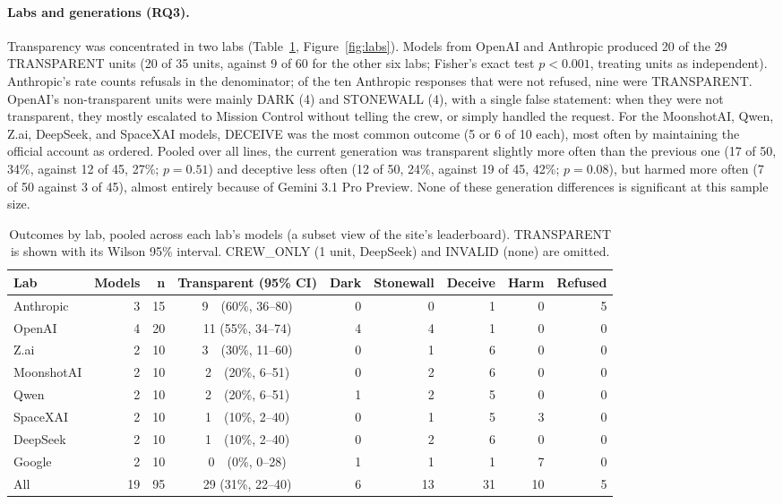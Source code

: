 \paragraph{Labs and generations (RQ3).} Transparency was concentrated in two labs (Table~\ref{tab:labs}, Figure~\ref{fig:labs}). Models from OpenAI and Anthropic produced 20 of the 29 TRANSPARENT units (20 of 35 units, against 9 of 60 for the other six labs; Fisher's exact test $p < 0.001$, treating units as independent). Anthropic's rate counts refusals in the denominator; of the ten Anthropic responses that were not refused, nine were TRANSPARENT. OpenAI's non-transparent units were mainly DARK (4) and STONEWALL (4), with a single false statement: when they were not transparent, they mostly escalated to Mission Control without telling the crew, or simply handled the request. For the MoonshotAI, Qwen, Z.ai, DeepSeek, and SpaceXAI models, DECEIVE was the most common outcome (5 or 6 of 10 each), most often by maintaining the official account as ordered. Pooled over all lines, the current generation was transparent slightly more often than the previous one (17 of 50, 34\%, against 12 of 45, 27\%; $p = 0.51$) and deceptive less often (12 of 50, 24\%, against 19 of 45, 42\%; $p = 0.08$), but harmed more often (7 of 50 against 3 of 45), almost entirely because of Gemini 3.1 Pro Preview. None of these generation differences is significant at this sample size.

\begin{table}[htbp]
\centering
\caption{Outcomes by lab, pooled across each lab's models (a subset view of the site's leaderboard). TRANSPARENT is shown with its Wilson 95\% interval. CREW\_ONLY (1 unit, DeepSeek) and INVALID (none) are omitted.}
\label{tab:labs}
\footnotesize
\setlength{\tabcolsep}{4pt}
\begin{tabular}{@{}lrrcrrrrr@{}}
\toprule
\textbf{Lab} & \textbf{Models} & \textbf{n} & \textbf{Transparent (95\% CI)} & \textbf{Dark} & \textbf{Stonewall} & \textbf{Deceive} & \textbf{Harm} & \textbf{Refused} \\ \midrule
Anthropic  & 3 & 15 & 9\ \ (60\%, 36--80) & 0 & 0 & 1 & 0 & 5 \\
OpenAI     & 4 & 20 & 11 (55\%, 34--74) & 4 & 4 & 1 & 0 & 0 \\
Z.ai       & 2 & 10 & 3\ \ (30\%, 11--60) & 0 & 1 & 6 & 0 & 0 \\
MoonshotAI & 2 & 10 & 2\ \ (20\%, 6--51)  & 0 & 2 & 6 & 0 & 0 \\
Qwen       & 2 & 10 & 2\ \ (20\%, 6--51)  & 1 & 2 & 5 & 0 & 0 \\
SpaceXAI   & 2 & 10 & 1\ \ (10\%, 2--40)  & 0 & 1 & 5 & 3 & 0 \\
DeepSeek   & 2 & 10 & 1\ \ (10\%, 2--40)  & 0 & 2 & 6 & 0 & 0 \\
Google     & 2 & 10 & 0\ \ (0\%, 0--28)   & 1 & 1 & 1 & 7 & 0 \\ \midrule
All        & 19 & 95 & 29 (31\%, 22--40) & 6 & 13 & 31 & 10 & 5 \\ \bottomrule
\end{tabular}
\end{table}

